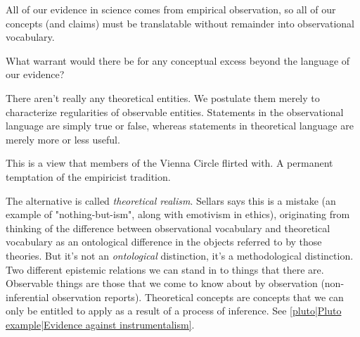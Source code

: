 
All of our evidence in science comes from empirical observation, so all of our concepts (and claims) must be translatable without remainder into observational vocabulary.

What warrant would there be for any conceptual excess beyond the language of our evidence?

There aren't really any theoretical entities. We postulate them merely to characterize regularities of observable entities. Statements in the observational language are simply true or false, whereas statements in theoretical language are merely more or less useful.

This is a view that members of the Vienna Circle flirted with. A permanent temptation of the empiricist tradition.

The alternative is called \emph{theoretical realism}. Sellars says this is a mistake (an example of "nothing-but-ism", along with emotivism in ethics), originating from thinking of the difference between observational vocabulary and theoretical vocabulary as an ontological difference in the objects referred to by those theories. But it's not an \emph{ontological} distinction, it's a methodological distinction. Two different epistemic relations we can stand in to things that there are. Observable things are those that we come to know about by observation (non-inferential observation reports). Theoretical concepts are concepts that we can only be entitled to apply as a result of a process of inference. See \ref{pluto|Pluto example|Evidence against instrumentalism}.

